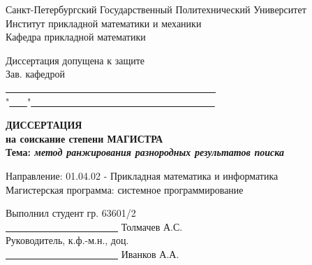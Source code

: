 \documentclass[12pt,a4paper]{report}
\begin{document}
\begin{titlepage}
\par
\vspace*{-4cm}
\begin{center}
{\large

Санкт-Петербургский Государственный Политехнический Университет\\
Институт прикладной математики и механики\\
Кафедра прикладной математики\\

\vspace*{0.5cm}

\begin{flushright}
Диссертация допущена к защите\\
Зав. кафедрой\ \ \ \ \ \ \ \ \ \ \ \ \ \ \ \ \ \ \ \ \ \ \ \ \ \ \ \\
\underline{ \ \ \ \ \ \ \ \ \ \ \ \ \ \ \ \ \ \ \ \ \ \ \ \ \ \ \ \ \ \ \ \ \ \ \ \ \ \ \ \ \ \ \ } \\
"\underline{ \ \ \ }"\underline{ \ \ \ \ \ \ \ \ \ \ \ \ \ \ \ \ \ \ \ \ \ \ \ \ \ \ \ \ \ \ \ \ \ \ \ \ \ }
\end{flushright}

\vspace*{2.0cm}

{\Large
  \textbf{
    ДИССЕРТАЦИЯ\\
    на соискание степени МАГИСТРА\\
  }
}
\vspace*{1cm}
\textbf{
  Тема: \emph{метод ранжирования разнородных результатов поиска}\\
}

}

\vspace*{1.5cm}

\begin{flushleft}
Направление: 01.04.02 - Прикладная математика и информатика\\
Магистерская программа: системное программирование\\
\end{flushleft}

\vspace*{1cm}

Выполнил студент гр. 63601/2 \ \ \ \ \ \ \ \ \ \ \ \ \ \ \ \ \ \ \ \ \ \ \ \ \ \ \ \ \ \ \ \ \ \ \ \ \ \underline{ \ \ \ \ \ \ \ \ \ \ \ \ \ \ \ \ \ \ \ \ \ \ \ } Толмачев А.С.\\
\vspace*{0.3cm}
Руководитель, к.ф.-м.н., доц. \ \ \ \ \ \ \ \ \ \ \ \ \ \ \ \ \ \ \ \ \ \ \ \ \ \ \ \ \ \ \ \ \ \ \ \ \ \ \underline{ \ \ \ \ \ \ \ \ \ \ \ \ \ \ \ \ \ \ \ \ \ \ \ } Иванков А.А.
\vspace*{0.5cm}


\end{center}
\end{titlepage}
\end{document}
